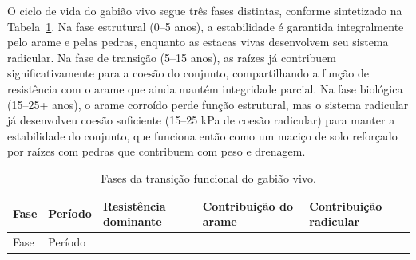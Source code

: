 \documentclass[
  portuguese,
  11pt,
  a4paper,
  open=any]{scrbook}
\begin{document}
O ciclo de vida do gabião vivo segue três fases distintas, conforme
sintetizado na Tabela~\ref{tbl-transicao}. Na fase estrutural (0--5
anos), a estabilidade é garantida integralmente pelo arame e pelas
pedras, enquanto as estacas vivas desenvolvem seu sistema radicular. Na
fase de transição (5--15 anos), as raízes já contribuem
significativamente para a coesão do conjunto, compartilhando a função de
resistência com o arame que ainda mantém integridade parcial. Na fase
biológica (15--25+ anos), o arame corroído perde função estrutural, mas
o sistema radicular já desenvolveu coesão suficiente (15--25 kPa de
coesão radicular) para manter a estabilidade do conjunto, que funciona
então como um maciço de solo reforçado por raízes com pedras que
contribuem com peso e drenagem.

\begin{longtable}[]{@{}
  >{\raggedright\arraybackslash}p{}
  >{\raggedright\arraybackslash}p{}
  >{\raggedright\arraybackslash}p{}
  >{\raggedright\arraybackslash}p{}
  >{\raggedright\arraybackslash}p{}@{}}
\caption{Fases da transição funcional do gabião
vivo.}\label{tbl-transicao}\tabularnewline
\toprule\noalign{}
\begin{minipage}[b]{\linewidth}\raggedright
Fase
\end{minipage} & \begin{minipage}[b]{\linewidth}\raggedright
Período
\end{minipage} & \begin{minipage}[b]{\linewidth}\raggedright
Resistência dominante
\end{minipage} & \begin{minipage}[b]{\linewidth}\raggedright
Contribuição do arame
\end{minipage} & \begin{minipage}[b]{\linewidth}\raggedright
Contribuição radicular
\end{minipage} \\
\midrule\noalign{}
\endfirsthead
\toprule\noalign{}
\begin{minipage}[b]{\linewidth}\raggedright
Fase
\end{minipage} & \begin{minipage}[b]{\linewidth}\raggedright
Período
\end{minipage} & \begin{minipage}[b]{\linewidth}\raggedright

\end{minipage}
\end{longtable}
\end{document}
